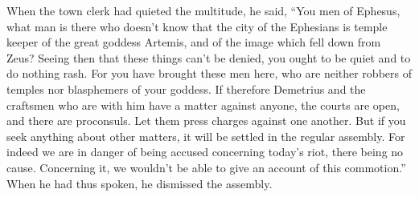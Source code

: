 {\par }{\PP {}When the town clerk had quieted the multitude, he said, “You men of Ephesus, what man is there who doesn’t know that the city of the Ephesians is temple keeper of the great goddess Artemis, and of the image which fell down from Zeus?
Seeing then that these things can’t be denied, you ought to be quiet and to do nothing rash.
For you have brought these men here, who are neither robbers of temples nor blasphemers of your goddess.
If therefore Demetrius and the craftsmen who are with him have a matter against anyone, the courts are open, and there are proconsuls. Let them press charges against one another.
But if you seek anything about other matters, it will be settled in the regular assembly.
For indeed we are in danger of being accused concerning today’s riot, there being no cause. Concerning it, we wouldn’t be able to give an account of this commotion.”
When he had thus spoken, he dismissed the assembly.

}
